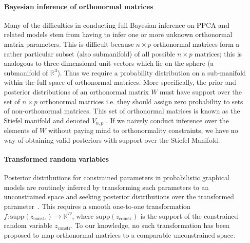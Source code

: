 \documentclass{article}
\begin{document}
\paragraph{Bayesian inference of orthonormal matrices} Many of the difficulties in conducting full Bayesian inference on PPCA and related models stem from having to infer one or more unknown orthonormal matrix parameters.  This is difficult because $n\times p$ orthonormal matrices form a rather particular subset (also submanifold) of all possible $n \times p$ matrices; this is analogous to three-dimensional unit vectors which lie on the sphere (a submanifold of $\mathbb{R}^3$). Thus we require a probability distribution on a sub-manifold within the full space of orthonormal matrices.  More specifically, the prior and posterior distributions of an orthonormal matrix $W$ must have support over the set of $n \times p$ orthonormal matrices i.e. they should assign zero probability to sets of non-orthonormal matrices. This set of orthonormal matrices is known as the Stiefel manifold and denoted $V_{n,p}$ \citep{muirhead2009aspects}. If we naively conduct inference over the elements of $W$ without paying mind to orthonormality constraints, we have no way of obtaining valid posteriors with support over the Stiefel Manifold.


\paragraph{Transformed random variables} Posterior distributions for constrained parameters in probabilistic graphical models are routinely inferred by transforming such parameters to an unconstrained space and seeking posterior distributions over the transformed parameter~\citep{carpenter2016stan, kucukelbir2014fully}. This requires a smooth one-to-one transformation $f: \mathrm{supp}(z_\mathrm{constr}) \to \mathbb{R}^D$, where $\mathrm{supp}(z_\mathrm{constr})$ is the support of the constrained random variable $z_\mathrm{constr}$. To our knowledge, no such transformation has been proposed to map orthonormal matrices to a comparable unconstrained space.
\end{document}
